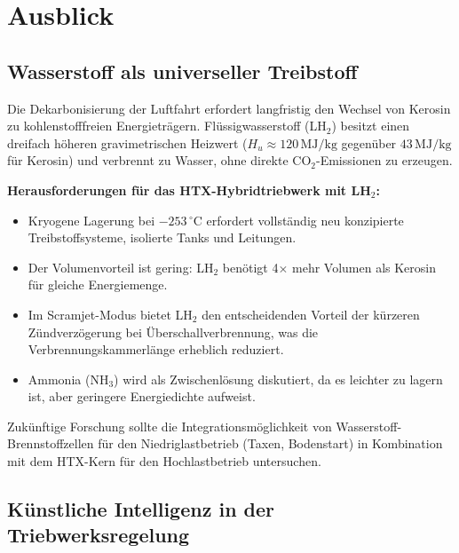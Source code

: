 ﻿\documentclass[12pt,a4paper]{article}
\theoremstyle{remark}
\begin{document}
\section{Ausblick}
\label{sec:ausblick}

\subsection{Wasserstoff als universeller Treibstoff}

Die Dekarbonisierung der Luftfahrt erfordert langfristig den Wechsel von
Kerosin zu kohlenstofffreien Energietr\"agern.
Fl\"ussigwasserstoff (LH$_2$) besitzt einen dreifach h\"oheren gravimetrischen Heizwert
($H_u \approx 120\,\mathrm{MJ/kg}$ gegen\"uber $43\,\mathrm{MJ/kg}$ f\"ur Kerosin)
und verbrennt zu Wasser, ohne direkte CO$_2$-Emissionen zu erzeugen.

\textbf{Herausforderungen f\"ur das HTX-Hybridtriebwerk mit LH$_2$:}
\begin{itemize}
  \item Kryogene Lagerung bei $-253\,^\circ\mathrm{C}$ erfordert vollst\"andig neu konzipierte
        Treibstoffsysteme, isolierte Tanks und Leitungen.
  \item Der Volumenvorteil ist gering: LH$_2$ ben\"otigt 4$\times$ mehr Volumen als Kerosin
        f\"ur gleiche Energiemenge.
  \item Im Scramjet-Modus bietet LH$_2$ den entscheidenden Vorteil der
        k\"urzeren Z\"undverz\"ogerung bei Überschallverbrennung,
        was die Verbrennungskammerl\"ange erheblich reduziert.
  \item Ammonia (NH$_3$) wird als Zwischenl\"osung diskutiert,
        da es leichter zu lagern ist, aber geringere Energiedichte aufweist.
\end{itemize}

Zuk\"unftige Forschung sollte die Integrations\-m\"oglichkeit von
Wasserstoff-Brennstoffzellen f\"ur den Niedriglastbetrieb (Taxen, Bodenstart)
in Kombination mit dem HTX-Kern f\"ur den Hochlastbetrieb untersuchen.

\subsection{K\"unstliche Intelligenz in der Triebwerksregelung}
\end{document}
